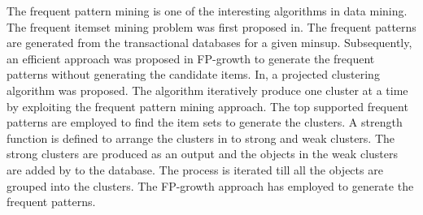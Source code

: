 The frequent pattern mining\cite{bib7} is one of the interesting
algorithms in data mining. The frequent itemset mining
problem was first proposed in\cite{bib4}. The frequent patterns
are generated from the transactional databases for a given
minsup. Subsequently, an efficient approach was proposed
in FP-growth\cite{bib8} to generate the frequent patterns without
generating the candidate items. In\cite{bib18, bib19}, a projected clustering algorithm was proposed. The algorithm iteratively
produce one cluster at a time by exploiting the frequent pattern mining approach. The top supported frequent patterns
are employed to find the item sets to generate the clusters.
A strength function is defined to arrange the clusters in to
strong and weak clusters. The strong clusters are produced
as an output and the objects in the weak clusters are added
by to the database. The process is iterated till all the objects
are grouped into the clusters. The FP-growth approach has
employed to generate the frequent patterns.
